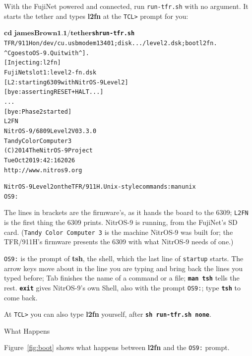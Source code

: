 \documentclass[10pt,twoside,openany]{book}
\makeatletter
\newcommand{\release}{jamesBrown1.1}
\newcommand{\cmd}[1]{\textbf{#1}}            %
\newcommand{\file}[1]{\texttt{#1}}           %
\newcommand{\key}[1]{\textsf{\small #1}}     %
\newcommand{\type}[1]{\texttt{\textbf{#1}}}  %
\newenvironment{ex}{\par\vspace{0.3ex}\small\begin{alltt}}{\end{alltt}\vspace{0.3ex}}
\renewcommand{\section}{\@startsection{section}{1}{0pt}{3.2ex plus 1ex}{1.2ex}%
  {\sffamily\bfseries\large}}
\makeatother
\begin{document}
With the FujiNet powered and connected, run \file{run-tfr.sh} with no
argument. It starts the tether and types \cmd{l2fn} at the
\texttt{TCL>} prompt for you:
\begin{ex}
$ \textbf{cd \release/tether}
$ \textbf{sh run-tfr.sh}
TFR/911H on /dev/cu.usbmodem13401; disk .../level2.dsk; boot l2fn.
^C goes to OS-9.  Quit with ^] .
[Injecting: l2fn]
FujiNet slot 1: level2-fn.dsk
[L2: starting 6309 with NitrOS-9 Level 2]
[bye: asserting RESET+HALT...]
   ...
[bye: Phase 2 started]
L2FN
NitrOS-9/6809 Level 2 V03.3.0
Tandy Color Computer 3
(C) 2014 The NitrOS-9 Project
Tue Oct 20 19:42:16 2026
http://www.nitros9.org

NitrOS-9 Level 2 on the TFR/911H.  Unix-style commands: man unix
OS9:
\end{ex}

The lines in brackets are the firmware's, as it hands the board to the
6309; \texttt{L2FN} is the first thing the 6309 prints. NitrOS-9 is
running, from the FujiNet's SD card. (\texttt{Tandy Color
Computer~3} is the machine NitrOS-9 was built for; the TFR/911H's
firmware presents the 6309 with what NitrOS-9 needs of one.)

\texttt{OS9:} is the prompt of \cmd{tsh}, the shell, which the last line
of \file{startup} starts. The arrow keys move about in the line you are
typing and bring back the lines you typed before; \key{Tab} finishes the
name of a command or a file; \type{man tsh} tells the rest. \type{exit}
gives NitrOS-9's own Shell, also with the prompt \texttt{OS9:}; type
\type{tsh} to come back.

At \texttt{TCL>} you can also type \cmd{l2fn} yourself, after
\type{sh run-tfr.sh none}.

\section{What Happens}

Figure~\ref{fig:boot} shows what happens between \cmd{l2fn} and the
\texttt{OS9:} prompt.
\end{document}
